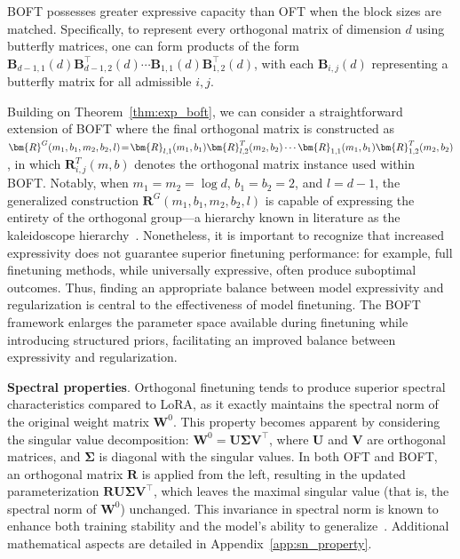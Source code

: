 \begin{theorem}\label{thm:exp_boft}
    BOFT possesses greater expressive capacity than OFT when the block sizes are matched. Specifically, to represent every orthogonal matrix of dimension $d$ using butterfly matrices, one can form products of the form $\bm{B}_{d-1,1}(d)\bm{B}^\top_{d-1,2}(d)\cdots\bm{B}_{1,1}(d)\bm{B}^\top_{1,2}(d)$, with each $\bm{B}_{i,j}(d)$ representing a butterfly matrix for all admissible $i, j$.
\end{theorem}

Building on Theorem~\ref{thm:exp_boft}, we can consider a straightforward extension of BOFT where the final orthogonal matrix is constructed as $\thickmuskip=2mu \medmuskip=2mu \bm{R}^G(m_1,b_1,m_2,b_2,l)=\bm{R}_{l,1}(m_1,b_1)\bm{R}_{l,2}^T(m_2,b_2)\cdots\bm{R}_{1,1}(m_1,b_1)\bm{R}_{1,2}^T(m_2,b_2)$, in which $\bm{R}_{i,j}^T(m,b)$ denotes the orthogonal matrix instance used within BOFT. Notably, when $m_1=m_2=\log d$, $b_1=b_2=2$, and $l=d-1$, the generalized construction $\bm{R}^G(m_1,b_1,m_2,b_2,l)$ is capable of expressing the entirety of the orthogonal group—a hierarchy known in literature as the kaleidoscope hierarchy~\cite{dao2019kaleidoscope}. Nonetheless, it is important to recognize that increased expressivity does not guarantee superior finetuning performance: for example, full finetuning methods, while universally expressive, often produce suboptimal outcomes. Thus, finding an appropriate balance between model expressivity and regularization is central to the effectiveness of model finetuning. The BOFT framework enlarges the parameter space available during finetuning while introducing structured priors, facilitating an improved balance between expressivity and regularization.

\textbf{Spectral properties}. Orthogonal finetuning tends to produce superior spectral characteristics compared to LoRA, as it exactly maintains the spectral norm of the original weight matrix $\bm{W}^0$. This property becomes apparent by considering the singular value decomposition: $\bm{W}^0=\bm{U}\bm{\Sigma}\bm{V}^\top$, where $\bm{U}$ and $\bm{V}$ are orthogonal matrices, and $\bm{\Sigma}$ is diagonal with the singular values. In both OFT and BOFT, an orthogonal matrix $\bm{R}$ is applied from the left, resulting in the updated parameterization $\bm{R}\bm{U}\bm{\Sigma}\bm{V}^\top$, which leaves the maximal singular value (that is, the spectral norm of $\bm{W}^0$) unchanged. This invariance in spectral norm is known to enhance both training stability and the model's ability to generalize~\cite{miyato2018spectral,yoshida2017spectral}. Additional mathematical aspects are detailed in Appendix~\ref{app:sn_property}.

